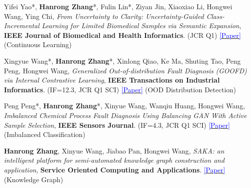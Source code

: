 \documentclass[letterpaper,11pt]{article}
\newcommand{\catg}[1]{{\footnotesize\textcolor{tagcolor}{#1}}}
\begin{document}
\begin{enumerate}[itemsep=5pt, topsep=5pt, parsep=1pt, leftmargin=*, label={[\arabic*]}]
    \item \small{Yifei Yao*, \textbf{Hanrong Zhang}*, Fulin Lin*, Ziyan Jin, Xiaoxiao Li, Hongwei Wang, Ying Chi, \textit{From Uncertainty to Clarity: Uncertainty-Guided Class-Incremental Learning for Limited Biomedical Samples via Semantic Expansion}, \textbf{IEEE Journal of Biomedical and Health Informatics}. (JCR Q1) \href{https://ieeexplore.ieee.org/document/11554906}{\textcolor{blue}{[Paper]}} \catg{(Continuous Learning)}}
    \item \small{Xingyue Wang*, \textbf{Hanrong Zhang}*, Xinlong Qiao, Ke Ma, Shuting Tao, Peng Peng, Hongwei Wang, \textit{Generalized Out-of-distribution Fault Diagnosis (GOOFD) via Internal Contrastive Learning}, \textbf{IEEE Transactions on Industrial Informatics}. (IF=12.3, JCR Q1 SCI) \href{https://ieeexplore.ieee.org/abstract/document/10510599}{\textcolor{blue}{[Paper]}} \catg{(OOD Distribution Detection)}}
    \item \small{Peng Peng*, \textbf{Hanrong Zhang}*, Xinyue Wang, Wanqiu Huang, Hongwei Wang, \textit{Imbalanced Chemical Process Fault Diagnosis Using Balancing GAN With Active Sample Selection}, \textbf{IEEE Sensors Journal}. (IF=4.3, JCR Q1 SCI) \href{https://ieeexplore.ieee.org/abstract/document/10114639}{\textcolor{blue}{[Paper]}} \catg{(Imbalanced Classification)}}
    \item \small{\textbf{Hanrong Zhang}, Xinyue Wang, Jiabao Pan, Hongwei Wang, \textit{SAKA: an intelligent platform for semi-automated knowledge graph construction and application}, \textbf{Service Oriented Computing and Applications}. \href{https://link.springer.com/article/10.1007/s11761-023-00371-x}{\textcolor{blue}{[Paper]}} \catg{(Knowledge Graph)}}

\end{enumerate}
\end{document}
